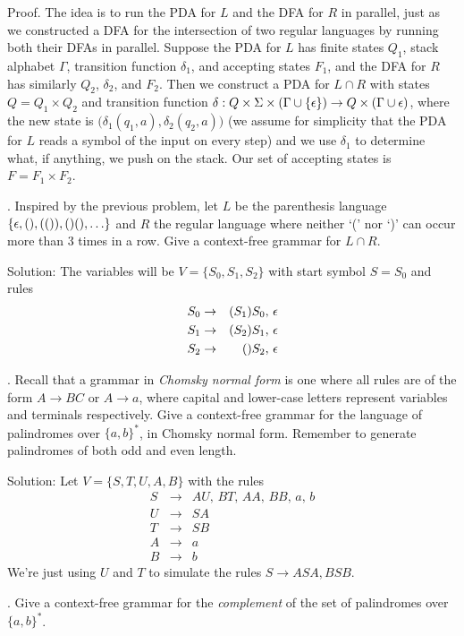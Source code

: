 \documentclass[12pt]{article}
\begin{document}
Proof. The idea is to run the PDA for $L$ and the DFA for $R$ in parallel, just as we constructed a DFA for the intersection of two regular languages by running both their DFAs in parallel.  Suppose the PDA for $L$ has finite states $Q_1$, stack alphabet $\Gamma$, transition function $\delta_1$, and accepting states $F_1$, and the DFA for $R$ has similarly $Q_2$, $\delta_2$, and $F_2$.  Then we construct a PDA for $L \cap R$ with states $Q = Q_1 \times Q_2$ and transition function $\delta: Q \times \Sigma \times (\Gamma \cup \{\epsilon\}) \to Q \times (\Gamma \cup \epsilon)$, where the new state is $\bigl( \delta_1(q_1,a),\delta_2(q_2,a) \bigr)$ (we assume for simplicity that the PDA for $L$ reads a symbol of the input on every step) and we use $\delta_1$ to determine what, if anything, we push on the stack.  Our set of accepting states is $F = F_1 \times F_2$.

\newpage
{}. Inspired by the previous problem, let $L$ be the parenthesis language $\{ \epsilon, (), (()), ()(), \ldots \}$ and $R$ the regular language where neither `(' nor `)' can occur more than 3 times in a row.  Give a context-free grammar for $L \cap R$.

Solution: The variables will be $V=\{S_0,S_1,S_2\}$ with start symbol $S = S_0$ and rules 
\begin{eqnarray*}
S_0 & \to & (S_1)S_0, \,\epsilon \\
S_1 & \to & (S_2)S_1, \,\epsilon \\
S_2 & \to & ()S_2, \,\epsilon
\end{eqnarray*}

\medskip
{}. Recall that a grammar in {\em Chomsky normal form} is one where all rules are of the form $A \to BC$ or $A \to a$, where capital and lower-case letters represent variables and terminals respectively.  Give a context-free grammar for the language of palindromes over $\{a,b\}^*$, in Chomsky normal form.  Remember to generate palindromes of both odd and even length.

Solution: Let $V=\{S,T,U,A,B\}$ with the rules
\begin{eqnarray*}
S & \to & AU, \,BT, \,AA, \,BB, \,a, \, b \\
U & \to & SA \\
T & \to & SB \\
A & \to & a \\
B & \to & b
\end{eqnarray*}
We're just using $U$ and $T$ to simulate the rules $S \to ASA, BSB$.

\medskip
{}. Give a context-free grammar for the {\em complement} of the set of palindromes over $\{a,b\}^*$.
\end{document}

